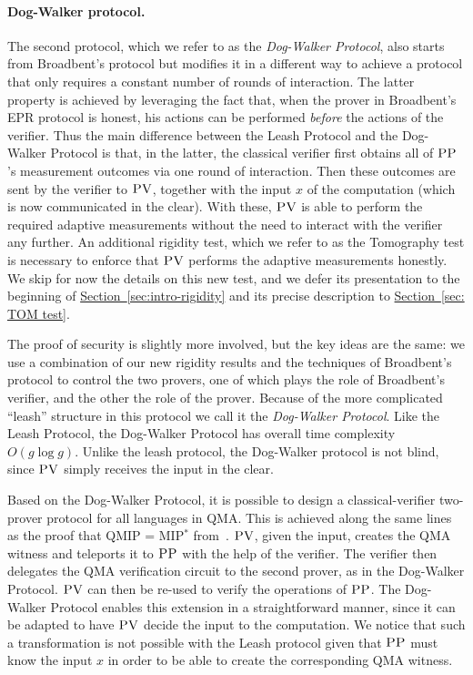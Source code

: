 \documentclass[11pt]{article}
\numberwithin{equation}{section}
\theoremstyle{definition}
\theoremstyle{plain}
\newcommand{\expref}[2]{\hyperref[#2]{#1~\ref{#2}}}
\newcommand{\pv}{\textsc{PV}}
\newcommand{\pp}{\textsc{PP}}
\begin{document}
\paragraph{Dog-Walker protocol.} %
The second protocol, which we refer to as the \emph{Dog-Walker Protocol}, also starts from Broadbent's protocol but modifies it in a
different way to achieve a protocol that only requires a constant number of rounds of
interaction. 
The latter property is achieved by leveraging the fact that, when the prover in Broadbent's EPR protocol is honest, his actions can be performed \emph{before} the actions of the verifier.
Thus the main difference between the Leash Protocol and the Dog-Walker Protocol is that, in the latter, the classical verifier first obtains all of $\pp$'s measurement outcomes via one round of interaction. Then these outcomes are sent by the verifier to $\pv$, together with the input $x$ of the computation (which is now communicated in the clear). With these, $\pv$ is able to perform the required adaptive measurements without the need to interact with the verifier any further. An additional rigidity test, which we refer to as the Tomography test is necessary to enforce that $\pv$ performs the adaptive measurements honestly. We skip for now the details on this new test, and we defer its presentation to the beginning of \expref{Section}{sec:intro-rigidity} and its precise description to \expref{Section}{sec: TOM test}.

The proof of security is slightly more involved, but the key ideas are the same: we use a combination of our new rigidity results and the techniques of Broadbent's protocol to control the two provers, one of which plays the role of Broadbent's verifier, and the other the role of the prover. Because of the more complicated ``leash'' structure in this protocol we call it the \emph{Dog-Walker Protocol}. 
 Like the Leash Protocol, the Dog-Walker Protocol has overall time complexity $O(g\log g)$. Unlike the leash protocol, the Dog-Walker protocol is not blind, since $\pv$ simply receives the input in the clear.



Based on the Dog-Walker Protocol, it is possible to design a classical-verifier  two-prover protocol for all languages in QMA. This is achieved along the same lines as the proof that QMIP = MIP$^*$ from~\cite{reichardt2012classical}. $\pv$, given the input, creates the QMA witness and teleports it to $\pp$ with the help of the verifier. The verifier then delegates the QMA verification circuit to the second prover, as in the Dog-Walker Protocol. $\pv$ can then be re-used to verify the operations of $\pp$. The Dog-Walker Protocol enables this extension in a straightforward manner, since it can be adapted to have $\pv$ decide the input to the computation. We notice that such a transformation is not possible with the Leash protocol given that $\pp$ must know the input $x$ in order to be able to create the corresponding QMA witness.
\end{document}
